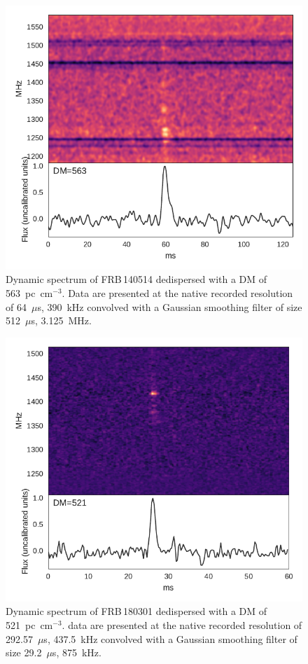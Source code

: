 \documentclass[a4paper,fleqn,usenatbib]{mnras}
\begin{document}
\begin{figure}
    \includegraphics[width=1.0\linewidth]{figures/FRB140514.pdf}
    \caption{Dynamic spectrum of FRB\,140514 dedispersed with a DM of
    563~pc~cm$^{-3}$.  Data are presented at the native recorded resolution of
    64~$\mu$s, 390~kHz convolved with a Gaussian smoothing filter of size
    512~$\mu$s, 3.125~MHz.
    }
    \label{fig:FRB140514}
\end{figure}

\begin{figure}
    \includegraphics[width=1.0\linewidth]{figures/FRB180301.pdf}
    \caption{Dynamic spectrum of FRB\,180301 dedispersed with a DM of
    521~pc~cm$^{-3}$.  data are presented at the native recorded resolution of
    292.57~$\mu$s, 437.5~kHz convolved with a Gaussian smoothing filter of size
    29.2~$\mu$s, 875~kHz.
    }
    \label{fig:FRB180301}
\end{figure}
\end{document}

